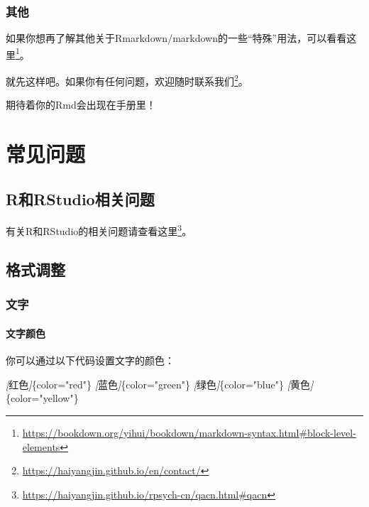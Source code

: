 \documentclass[]{ctexbook}
\newenvironment{Shaded}{\begin{snugshade}}{\end{snugshade}}
\newcommand{\CommentTok}[1]{\textcolor[rgb]{0.56,0.35,0.01}{\textit{#1}}}
\newcommand{\NormalTok}[1]{#1}
\newcommand{\OtherTok}[1]{\textcolor[rgb]{0.56,0.35,0.01}{#1}}
\renewcommand{\href}[2]{#2\footnote{\url{#1}}}
\theoremstyle{definition}
\theoremstyle{definition}
\theoremstyle{definition}
\theoremstyle{definition}
\theoremstyle{remark}
\begin{document}
\subsection{其他}\label{ux5176ux4ed6}

如果你想再了解其他关于Rmarkdown/markdown的一些``特殊''用法，可以看看\href{https://bookdown.org/yihui/bookdown/markdown-syntax.html\#block-level-elements}{这里}。

就先这样吧。如果你有任何问题，欢迎随时联系\href{https://haiyangjin.github.io/en/contact/}{我们}。

期待着你的Rmd会出现在手册里！

\chapter{常见问题}\label{qa}

\section{R和RStudio相关问题}\label{rux548crstudioux76f8ux5173ux95eeux9898}

有关R和RStudio的相关问题请查看\href{https://haiyangjin.github.io/rpsych-cn/qacn.html\#qacn}{这里}。

\section{格式调整}\label{ux683cux5f0fux8c03ux6574}

\subsection{文字}\label{ux6587ux5b57}

\subsubsection{文字颜色}\label{ux6587ux5b57ux989cux8272}

你可以通过以下代码设置文字的颜色：

\begin{Shaded}
\begin{Highlighting}[]
\CommentTok{[}\OtherTok{红色}\CommentTok{]}\NormalTok{\{color="red"\}   }
\CommentTok{[}\OtherTok{蓝色}\CommentTok{]}\NormalTok{\{color="green"\}  }
\CommentTok{[}\OtherTok{绿色}\CommentTok{]}\NormalTok{\{color="blue"\}  }
\CommentTok{[}\OtherTok{黄色}\CommentTok{]}\NormalTok{\{color="yellow"\}}
\end{Highlighting}
\end{Shaded}
\end{document}
